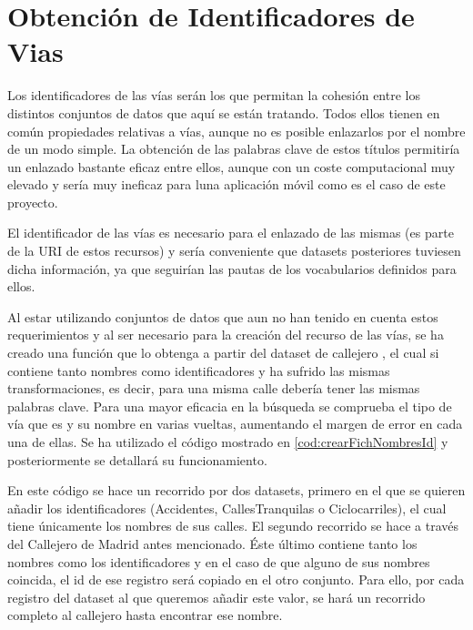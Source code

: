 \section{Obtención de Identificadores de Vias}

Los identificadores de las vías serán los que permitan la cohesión entre los distintos conjuntos de datos que aquí se están tratando. Todos ellos tienen en común propiedades relativas a vías, aunque no es posible enlazarlos por el nombre de un modo simple.
La obtención de las palabras clave de estos títulos permitiría un enlazado bastante eficaz entre ellos, aunque con un coste computacional muy elevado y sería muy ineficaz para luna aplicación móvil como es el caso de este proyecto.

El identificador de las vías es necesario para el enlazado de las mismas (es parte de la URI de estos recursos) y sería conveniente que datasets posteriores tuviesen dicha información, ya que seguirían las pautas de los vocabularios definidos para ellos.

Al estar utilizando conjuntos de datos que aun no han tenido en cuenta estos requerimientos y al ser necesario para la creación del recurso de las vías, se ha creado una función que lo obtenga a partir del dataset de callejero \cite{datosmadrid_callejero}, el cual si contiene tanto nombres como identificadores y ha sufrido las mismas transformaciones, es decir, para una misma calle debería tener las mismas palabras clave. Para una mayor eficacia en la búsqueda se comprueba el tipo de vía que es y su nombre en varias vueltas, aumentando el margen de error en cada una de ellas.
Se ha utilizado el código mostrado en \ref{cod:crearFichNombresId} y posteriormente se detallará su funcionamiento.



En este código se hace un recorrido por dos datasets, primero en el que se quieren añadir los identificadores (Accidentes, CallesTranquilas o Ciclocarriles), el cual tiene únicamente los nombres de sus calles. El segundo recorrido se hace a través del Callejero de Madrid antes mencionado. Éste último contiene tanto los nombres como los identificadores y en el caso de que alguno de sus nombres coincida, el id de ese registro será copiado en el otro conjunto. Para ello, por cada registro del dataset al que queremos añadir este valor, se hará un recorrido completo al callejero hasta encontrar ese nombre.

